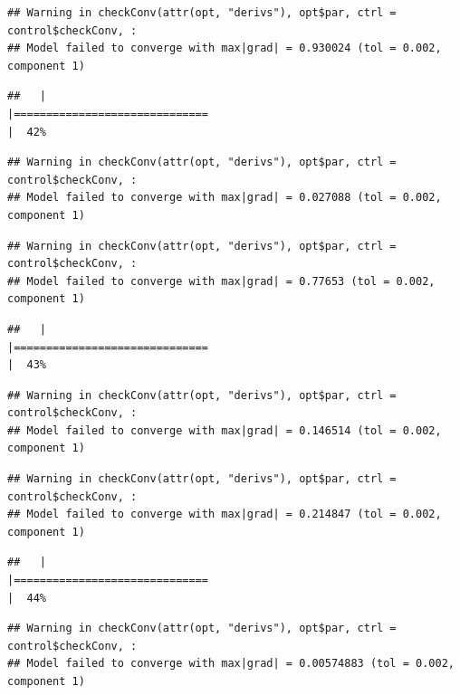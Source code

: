 \documentclass[
  12pt,
]{book}
\begin{document}
\begin{verbatim}
## Warning in checkConv(attr(opt, "derivs"), opt$par, ctrl = control$checkConv, :
## Model failed to converge with max|grad| = 0.930024 (tol = 0.002, component 1)
\end{verbatim}

\begin{verbatim}
##   |                                                                              |==============================                                        |  42%
\end{verbatim}

\begin{verbatim}
## Warning in checkConv(attr(opt, "derivs"), opt$par, ctrl = control$checkConv, :
## Model failed to converge with max|grad| = 0.027088 (tol = 0.002, component 1)
\end{verbatim}

\begin{verbatim}
## Warning in checkConv(attr(opt, "derivs"), opt$par, ctrl = control$checkConv, :
## Model failed to converge with max|grad| = 0.77653 (tol = 0.002, component 1)
\end{verbatim}

\begin{verbatim}
##   |                                                                              |==============================                                        |  43%
\end{verbatim}

\begin{verbatim}
## Warning in checkConv(attr(opt, "derivs"), opt$par, ctrl = control$checkConv, :
## Model failed to converge with max|grad| = 0.146514 (tol = 0.002, component 1)
\end{verbatim}

\begin{verbatim}
## Warning in checkConv(attr(opt, "derivs"), opt$par, ctrl = control$checkConv, :
## Model failed to converge with max|grad| = 0.214847 (tol = 0.002, component 1)
\end{verbatim}

\begin{verbatim}
##   |                                                                              |==============================                                        |  44%
\end{verbatim}

\begin{verbatim}
## Warning in checkConv(attr(opt, "derivs"), opt$par, ctrl = control$checkConv, :
## Model failed to converge with max|grad| = 0.00574883 (tol = 0.002, component 1)
\end{verbatim}
\end{document}

